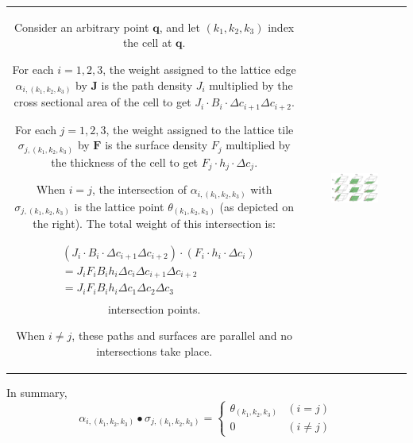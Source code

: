 \documentclass{book}
\begin{document}
\begin{tabular}{cc}
\parbox{0.5\textwidth}{
Consider an arbitrary point \(\mathbf{q}\), and let \((k_1, k_2, k_3)\) index the cell at \(\mathbf{q}\). 

For each \(i = 1, 2, 3\), the weight assigned to the lattice edge \(\alpha_{i,(k_1,k_2,k_3)}\) by \(\mathbf{J}\) is the path density \(J_i\) multiplied by the cross sectional area of the cell to get \(J_i \cdot B_i \cdot \Delta c_{i+1} \Delta c_{i+2}\). 

For each \(j = 1, 2, 3\), the weight assigned to the lattice tile \(\sigma_{j,(k_1,k_2,k_3)}\) by \(\mathbf{F}\) is the surface density \(F_j\) multiplied by the thickness of the cell to get \(F_j \cdot h_j \cdot \Delta c_j\). 

When \(i = j\), the intersection of \(\alpha_{i, (k_1, k_2, k_3)}\) with \(\sigma_{j, (k_1, k_2, k_3)}\) is the lattice point \(\theta_{(k_1, k_2, k_3)}\) (as depicted on the right). The total weight of this intersection is:

\begin{align*}
& (J_i \cdot B_i \cdot \Delta c_{i+1} \Delta c_{i+2}) \cdot (F_i \cdot h_i \cdot \Delta c_i) \\
& = J_i F_i B_i h_i \Delta c_i \Delta c_{i+1} \Delta c_{i+2} \\
& = J_i F_i B_i h_i \Delta c_1 \Delta c_2 \Delta c_3 \\
\end{align*}
intersection points. 

When \(i \neq j\), these paths and surfaces are parallel and no intersections take place. 
} & \parbox{0.5\textwidth}{
\includegraphics[width = 0.5\textwidth]{Coordinate_systems/path_surface_intersection_cell}
}
\end{tabular}

\vspace{1mm}

In summary, 
\[\alpha_{i, (k_1,k_2,k_3)} \bullet \sigma_{j, (k_1,k_2,k_3)} = \left\{\begin{array}{cc} \theta_{(k_1, k_2, k_3)} & (i = j) \\ 0 & (i \neq j) \end{array}\right.\]
\end{document}
